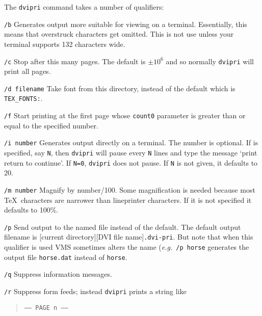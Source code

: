The \verb+dvipri+ command takes a number of qualifiers:
\begin{list}%
{}%
{\settowidth{\labelwidth}{\tt-f\em filename}
\settowidth{\labelsep}{aaaa}
\settowidth{\rightmargin}{aaa}
\addtolength{\labelwidth}{\labelsep}
\setlength{\leftmargin}{\labelwidth}}


\item[\tt /b] Generates output more suitable for viewing on a terminal.
Essentially, this means that overstruck characters get omitted. This is not use
unless your terminal supports 132 characters wide.

\item[\tt /c] Stop after this many pages. The default is $\pm 10^6$ and so
normally \verb+dvipri+ will print all pages.

\item[\tt  /d filename]   Take font from this directory, instead of the default
which is {\tt TEX\_FONTS:}.

\item[\tt /f] Start printing at the first page whose {\tt count0} parameter is
greater than or equal to the specified number.

\item[\tt /i number] Generates output directly on a terminal. The number is
optional. If is specified, say {\tt N}, then \verb+dvipri+ will pause every {\tt N}
lines and type the message `print return to continue'. If {\tt N=0}, \verb+dvipri+
does not pause. If {\tt N} is not given, it defaults to 20.

\item[\tt /m number] Magnify by number/100. Some magnification is needed
because most \TeX\ characters are narrower than lineprinter characters. If it
is not specified it defaults to 100\%.                                  

\item[\tt /p] Send output to the named file instead of the default. The default
output filename is [current directory][DVI file name]\verb+.dvi-pri+. But note that
when this qualifier is used VMS sometimes alters the name ({\em e.g.}~{\tt /p
horse} generates the output file {\tt horse.dat} instead of {\tt horse}.

\item[\tt /q] Suppress information messages.

\item[\tt /r] Suppress form feeds; instead \verb+dvipri+ prints a string like
\begin{quote}\tt ----- PAGE n ----- \end{quote} 


\end{list}
